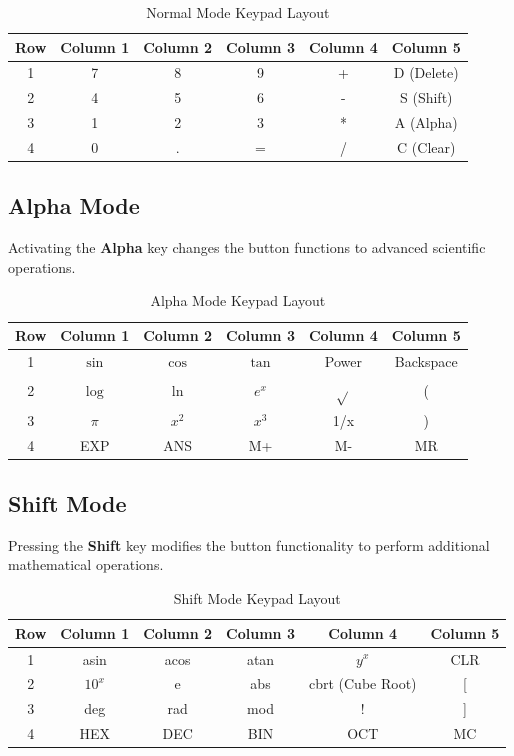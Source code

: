\documentclass[journal]{IEEEtran}
\numberwithin{equation}{enumi}
\numberwithin{figure}{enumi}
\begin{document}
\begin{table}[H]
\centering
\begin{tabular}{|c|c|c|c|c|c|}
\hline
Row & Column 1 & Column 2 & Column 3 & Column 4 & Column 5 \\
\hline
1 & 7 & 8 & 9 & + & D (Delete) \\
2 & 4 & 5 & 6 & - & S (Shift) \\
3 & 1 & 2 & 3 & * & A (Alpha) \\
4 & 0 & . & = & / & C (Clear) \\
\hline
\end{tabular}
\caption{Normal Mode Keypad Layout}
\end{table}

\subsection{Alpha Mode}
Activating the \textbf{Alpha} key changes the button functions to advanced scientific operations.

\begin{table}[H]
\centering
\begin{tabular}{|c|c|c|c|c|c|}
\hline
Row & Column 1 & Column 2 & Column 3 & Column 4 & Column 5 \\
\hline
1 & $\sin{}$ & $\cos{}$ & $\tan{}$ & Power & Backspace \\
2 & $\log{}$ & $\ln{}$ & $e^{x}$ & $\sqrt{}$ & ( \\
3 & $\pi$ & $x^2$ & $x^3$ & 1/x & ) \\
4 & EXP & ANS & M+ & M- & MR \\
\hline
\end{tabular}
\caption{Alpha Mode Keypad Layout}
\end{table}

\subsection{Shift Mode}
Pressing the \textbf{Shift} key modifies the button functionality to perform additional mathematical operations.

\begin{table}[H]
\centering
\begin{tabular}{|c|c|c|c|c|c|}
\hline
Row & Column 1 & Column 2 & Column 3 & Column 4 & Column 5 \\
\hline
1 & asin & acos & atan & $y^{x}$ & CLR \\
2 & $10^{x}$ & e & abs & cbrt (Cube Root) & [ \\
3 & deg & rad & mod & ! & ] \\
4 & HEX & DEC & BIN & OCT & MC \\
\hline
\end{tabular}
\caption{Shift Mode Keypad Layout}
\end{table}
\end{document}
